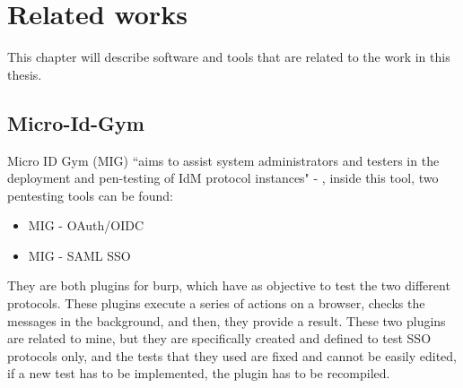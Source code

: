 \chapter{Related works}
\label{chap:Related_work}
This chapter will describe software and tools that are related to the work in this thesis.

\section{Micro-Id-Gym}
\label{sec:micro-id-gym}
Micro ID Gym (MIG) ``aims to assist system administrators and testers in the deployment and pen-testing of IdM protocol instances" - \cite{micro_id_gym}, inside this tool, two pentesting tools can be found:
\begin{itemize}
    \item MIG - OAuth/OIDC \cite{claudio_grisenti}
    \item MIG - SAML SSO \cite{stefano_facchini}
\end{itemize}
They are both plugins for \Gls{burp}, which have as objective to test the two different protocols. These plugins execute a series of actions on a browser, checks the messages in the background, and then, they provide a result.
These two plugins are related to mine, but they are specifically created and defined to test SSO protocols only, and the tests that they used are fixed and cannot be easily edited, if a new test has to be implemented, the plugin has to be recompiled.

